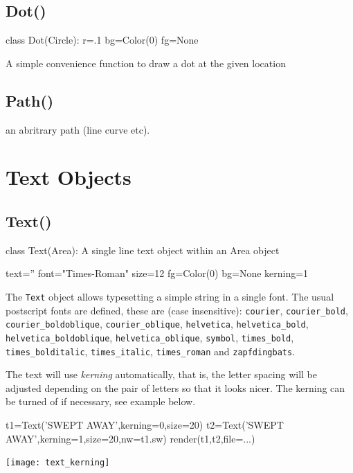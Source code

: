\documentclass[a4paper]{book}
\begin{document}
\subsection{Dot()}
\label{sec:dot}
\begin{python}
class Dot(Circle):
    r=.1
    bg=Color(0)
    fg=None
\end{python}

A simple convenience function to draw a dot at the given location

\subsection{Path()}
\label{sec:path}

an abritrary path (line curve etc).

\section{Text Objects}

\subsection{Text()}
\label{sec:text}
\begin{python}
class Text(Area):
    A single line text object within an Area object
    
    text=''
    font="Times-Roman"
    size=12
    fg=Color(0)
    bg=None
    kerning=1
\end{python}
The \Verb|Text| object allows typesetting a simple string in a single
font. The usual postscript fonts are defined, these are (case
insensitive): \Verb|courier|, \Verb|courier_bold|,
\Verb|courier_boldoblique|, \Verb|courier_oblique|, \Verb|helvetica|,
\Verb|helvetica_bold|, \Verb|helvetica_boldoblique|,
\Verb|helvetica_oblique|, \Verb|symbol|, \Verb|times_bold|,
\Verb|times_bolditalic|, \Verb|times_italic|, \Verb|times_roman| and
\Verb|zapfdingbats|.

The text will use \emph{kerning} automatically, that is, the
letter spacing will be adjusted depending on the pair of letters so
that it looks nicer. The kerning can be turned of if necessary, see
example below.
\begin{example}
\begin{python}
t1=Text('SWEPT AWAY',kerning=0,size=20)
t2=Text('SWEPT AWAY',kerning=1,size=20,nw=t1.sw)
render(t1,t2,file=...)
\end{python}
\begin{center}
  \texttt{[image: text\_kerning]}
\end{center}
\end{example}
\end{document}
